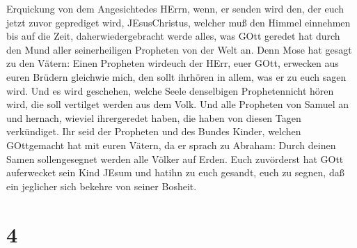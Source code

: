 Erquickung von dem Angesichtedes HErrn, wenn, er senden wird den, der
euch jetzt zuvor geprediget wird, JEsusChristus,  welcher
muß den Himmel einnehmen bis auf die Zeit, daherwiedergebracht werde
alles, was GOtt geredet hat durch den Mund aller seinerheiligen
Propheten von der Welt an.  Denn Mose hat gesagt zu den
Vätern: Einen Propheten wirdeuch der HErr, euer GOtt, erwecken aus euren
Brüdern gleichwie mich, den sollt ihrhören in allem, was er zu euch
sagen wird.  Und es wird geschehen, welche Seele
denselbigen Prophetennicht hören wird, die soll vertilget werden aus dem
Volk.  Und alle Propheten von Samuel an und hernach,
wieviel ihrergeredet haben, die haben von diesen Tagen verkündiget.
 Ihr seid der Propheten und des Bundes Kinder, welchen
GOttgemacht hat mit euren Vätern, da er sprach zu Abraham: Durch deinen
Samen sollengesegnet werden alle Völker auf Erden.  Euch
zuvörderst hat GOtt auferwecket sein Kind JEsum und hatihn zu euch
gesandt, euch zu segnen, daß ein jeglicher sich bekehre von seiner
Bosheit.

\hypertarget{section-3}{%
\section{4}\label{section-3}}

